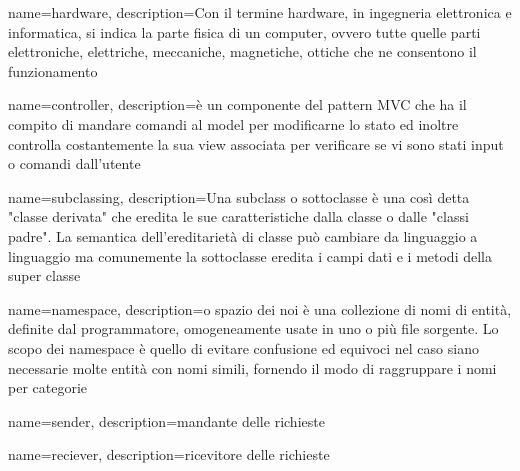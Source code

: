  {
	name=hardware,
	description={Con il termine hardware, in ingegneria elettronica e informatica, si indica la parte fisica di un computer, ovvero tutte quelle parti elettroniche, elettriche, meccaniche, magnetiche, ottiche che ne consentono il funzionamento}
}

 {
	name=controller,
	description={è un componente del pattern MVC che ha il compito di mandare comandi al model per modificarne lo stato ed inoltre controlla costantemente la sua view associata per verificare se vi sono stati input o comandi dall'utente}
}

 {
	name=subclassing,
	description={Una subclass o sottoclasse è una così detta "classe derivata" che eredita le sue caratteristiche dalla classe o dalle "classi padre". La semantica dell'ereditarietà di classe può cambiare da linguaggio a linguaggio ma comunemente la sottoclasse eredita i campi dati e i metodi della super classe }
}

 {
	name=namespace,
	description={o spazio dei noi è una collezione di nomi di entità, definite dal programmatore, omogeneamente usate in uno o più file sorgente. Lo scopo dei namespace è quello di evitare confusione ed equivoci nel caso siano necessarie molte entità con nomi simili, fornendo il modo di raggruppare i nomi per categorie}
}

 {
	name=sender,
	description={mandante delle richieste}
}

 {
	name=reciever,
		description={ricevitore delle richieste}
}




